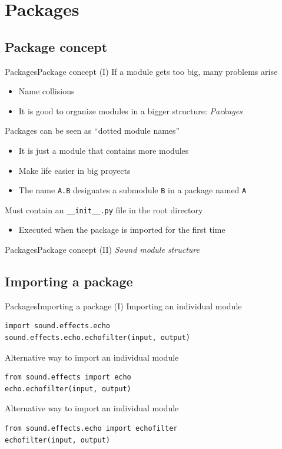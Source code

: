 \documentclass[10pt,compress]{beamer} %
\begin{document}
\section{Packages}
\subsection{Package concept}
\begin{frame}{Packages}{Package concept (I)}
		If a module gets too big, many problems arise
			\begin{itemize}
			\item Name collisions
			\item It is good to organize modules in a bigger structure: \textit{Packages}
			\end{itemize}
		Packages can be seen as ``dotted module names''
			\begin{itemize}
			\item It is just a module that contains more modules
			\item Make life easier in big proyects
			\item The name \texttt{A.B} designates a submodule \texttt{B} in a package named \texttt{A}
			\end{itemize}
		Must contain an \texttt{\_\_init\_\_.py} file in the root directory
			\begin{itemize}
			\item Executed when the package is imported for the first time
			\end{itemize}
\end{frame}

\begin{frame}{Packages}{Package concept (II)}
	\centering \textit{Sound module structure}\\
	
\end{frame}

\subsection{Importing a package}
\begin{frame}[fragile]{Packages}{Importing a package (I)}
	Importing an individual module
	\begin{verbatim}
import sound.effects.echo
sound.effects.echo.echofilter(input, output)
\end{verbatim}

	Alternative way to import an individual module
	\begin{verbatim}
from sound.effects import echo
echo.echofilter(input, output)
\end{verbatim}

	Alternative way to import an individual module
	\begin{verbatim}
from sound.effects.echo import echofilter
echofilter(input, output)
\end{verbatim}

\end{frame}
\end{document}
